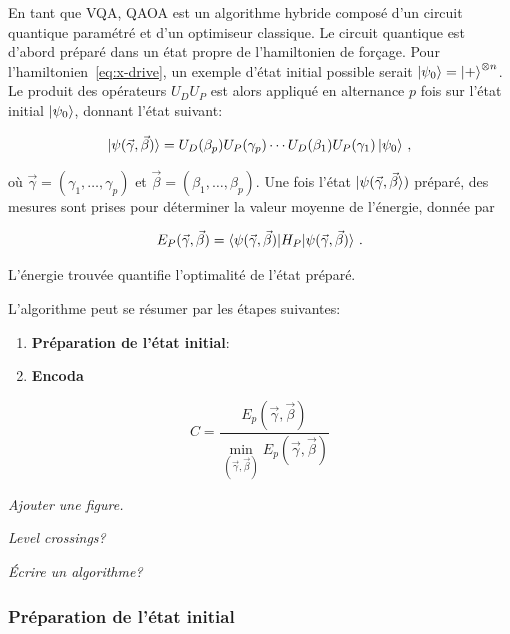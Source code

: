 En tant que VQA, QAOA est un algorithme hybride composé d'un circuit quantique paramétré et d'un optimiseur classique. Le circuit quantique est d'abord préparé dans un état propre de l'hamiltonien de forçage. Pour l'hamiltonien~\ref{eq:x-drive}, un exemple d'état initial possible serait $\ket{\psi_{0}} = \ket{+}^{\otimes n}$. Le produit des opérateurs $U_{D}U_{P}$ est alors appliqué en alternance $p$ fois sur l'état initial $\ket{\psi_{0}}$, donnant l'état suivant:

\begin{equation}
    \label{eq:final-state}
    \ket{\psi(\vec{\gamma}, \vec{\beta})} = U_D(\beta_p) U_P(\gamma_p) \cdots U_D(\beta_1) U_P(\gamma_1) \ket{\psi_{0}} \,,
\end{equation}

où $\vec{\gamma} = (\gamma_{1}, \dots, \gamma_{p})$ et $\vec{\beta} = (\beta_{1}, \dots, \beta_{p})$. Une fois l'état $\ket{\psi(\vec{\gamma}, \vec{\beta}})$ préparé, des mesures sont prises pour déterminer la valeur moyenne de l'énergie, donnée par

\begin{equation}
    E_{P} (\vec{\gamma}, \vec{\beta}) = \braket{ \psi(\vec{\gamma}, \vec{\beta}) | H_{P} | \psi(\vec{\gamma}, \vec{\beta}) } \,.
\end{equation}

L'énergie trouvée quantifie l'optimalité de l'état préparé.

L'algorithme peut se résumer par les étapes suivantes:

\begin{enumerate}[(1)]
    \item \textbf{Préparation de l'état initial}:
    \item \textbf{Encoda}
\end{enumerate}

\begin{equation}
    C = \frac{ E_{p} (\vec{\gamma}, \vec{\beta})}{\min_{(\vec{\gamma}, \vec{\beta})} E_{p} (\vec{\gamma}, \vec{\beta}) }
\end{equation}


\textcolor{mydarkred}{\textit{Ajouter une figure.}}

\textcolor{mydarkred}{\textit{Level crossings?}}

\textcolor{mydarkred}{\textit{Écrire un algorithme?}}


\subsubsection{Préparation de l'état initial}
\label{subsec:encodage-probleme}

